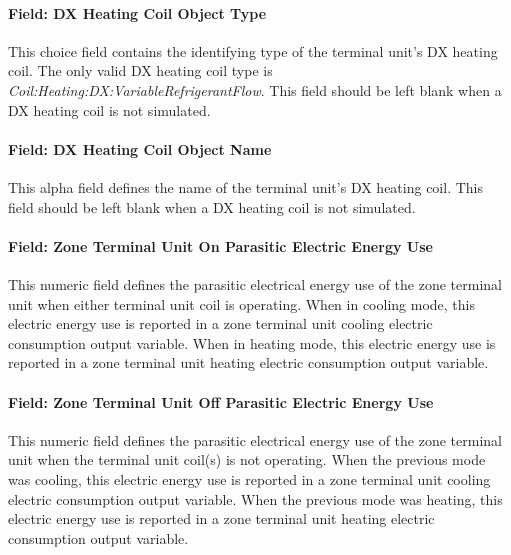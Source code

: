 \paragraph{Field: DX Heating Coil Object Type}\label{field-dx-heating-coil-object-type}

This choice field contains the identifying type of the terminal unit's DX heating coil. The only valid DX heating coil type is \textit{Coil:Heating:DX:VariableRefrigerantFlow}. This field should be left blank when a DX heating coil is not simulated.

\paragraph{Field: DX Heating Coil Object Name}\label{field-dx-heating-coil-object-name}

This alpha field defines the name of the terminal unit's DX heating coil. This field should be left blank when a DX heating coil is not simulated.

\paragraph{Field: Zone Terminal Unit On Parasitic Electric Energy Use}\label{field-zone-terminal-unit-on-parasitic-electric-energy-use-000}

This numeric field defines the parasitic electrical energy use of the zone terminal unit when either terminal unit coil is operating. When in cooling mode, this electric energy use is reported in a zone terminal unit cooling electric consumption output variable. When in heating mode, this electric energy use is reported in a zone terminal unit heating electric consumption output variable.

\paragraph{Field: Zone Terminal Unit Off Parasitic Electric Energy Use}\label{field-zone-terminal-unit-off-parasitic-electric-energy-use-000}

This numeric field defines the parasitic electrical energy use of the zone terminal unit when the terminal unit coil(s) is not operating. When the previous mode was cooling, this electric energy use is reported in a zone terminal unit cooling electric consumption output variable. When the previous mode was heating, this electric energy use is reported in a zone terminal unit heating electric consumption output variable.

